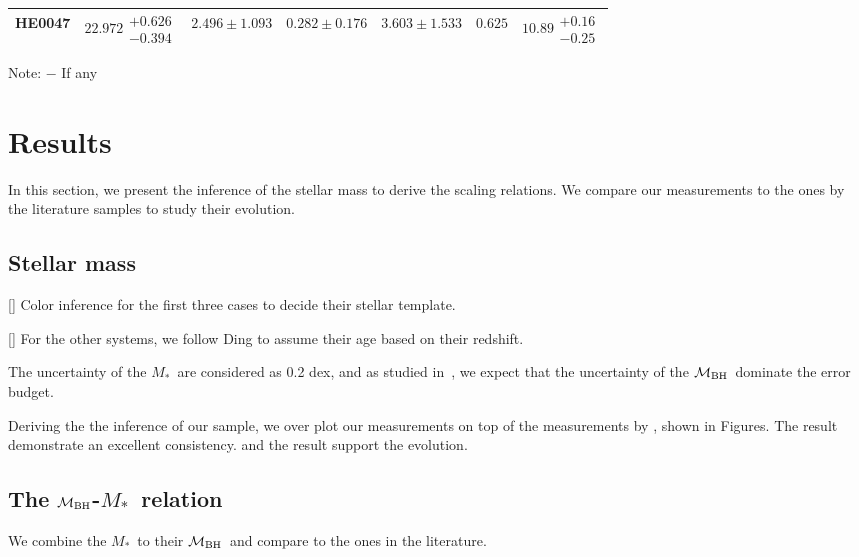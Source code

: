 \documentclass[fleqn,usenatbib]{mnras}
\newcommand{\mbh}{$\mathcal M_{\rm BH}$}
\newcommand{\mstar}{{$M_*$}}
\begin{document}
\begin{table}
\begin{threeparttable}
\begin{tabular}{ccccccc}
HE0047 & $22.972\substack{+0.626\\-0.394}$ & $2.496\pm1.093$ & $0.282\pm0.176$ & $3.603\pm1.533$ & $0.625$ & $10.89\substack{+0.16\\-0.25}$ \\
\hline
\end{tabular}
\begin{tablenotes}
      \small
      \item Note: $-$ If any
\end{tablenotes}    
\end{threeparttable}
\end{table}


\section{Results}
In this section, we present the inference of the stellar mass to derive the scaling relations. We compare our measurements to the ones by the  literature samples to study their evolution.

\subsection{Stellar mass}
[] Color inference for the first three cases to decide their stellar template. 

[] For the other systems, we follow Ding to assume their age based on their redshift.

The uncertainty of the \mstar\ are considered as 0.2 dex, and as studied in~\citet{Ding2017a}, we expect that the uncertainty of the \mbh\ dominate the error budget.

Deriving the the inference of our sample, we over plot our measurements on top of the measurements by \citet{Ding2020}, shown in Figures. The result demonstrate an excellent consistency. and the result support the evolution. 

\subsection{The \mbh-\mstar\ relation}
We combine the \mstar\ to their \mbh\ and compare to the ones in the literature.
\end{document}
